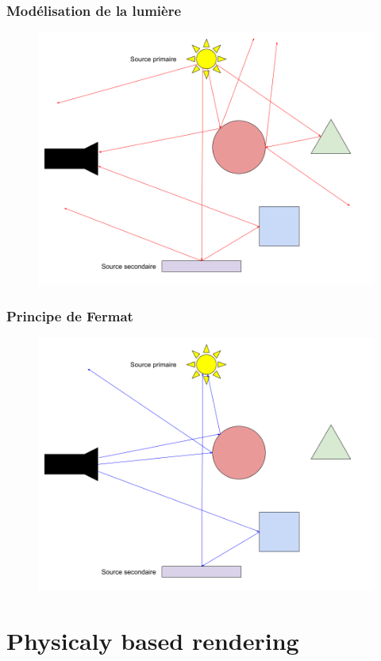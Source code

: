 \documentclass[handout]{beamer}
\begin{document}
\begin{frame}
    \frametitle{Modélisation de la lumière}
    \begin{figure}
        \includegraphics[scale=0.3]{Lumiere.png}
    \end{figure}
\end{frame}

\begin{frame}
    \frametitle{Principe de Fermat}
    \begin{figure}
        \includegraphics[scale=0.3]{Fermat.png}
    \end{figure}
\end{frame}

\section{Physicaly based rendering}
\end{document}

